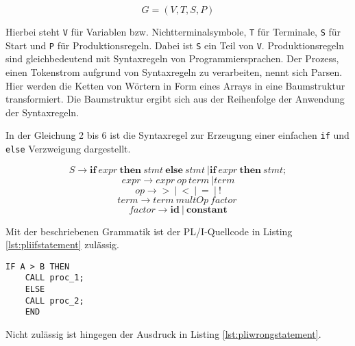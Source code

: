 \begin{center}
	\begin{equation}\label{eqn:grammar}
		G=(V,T,S,P)
	\end{equation}
\end{center}


Hierbei steht \verb+V+ für Variablen bzw. Nichtterminalsymbole, \verb+T+ für Terminale, \verb+S+ für Start und \verb+P+ für Produktionsregeln. Dabei ist \verb+S+ ein Teil von \verb+V+. Produktionsregeln sind gleichbedeutend mit Syntaxregeln von Programmiersprachen. 
Der Prozess, einen Tokenstrom aufgrund von Syntaxregeln zu verarbeiten, nennt sich Parsen.
Hier werden die Ketten von Wörtern in Form eines Arrays in eine Baumstruktur transformiert.
Die Baumstruktur ergibt sich aus der Reihenfolge der Anwendung der Syntaxregeln.


In der Gleichung 2 bis 6 ist die Syntaxregel zur Erzeugung einer einfachen \verb+if+ und \verb+else+ Verzweigung dargestellt.

\begin{center}
	\begin{equation}\label{eqn:start}
		S \to \mathbf{if}\: expr\: \mathbf{then}\: stmt\: \mathbf{else}\: stmt\: | \mathbf{if}\: expr\: \mathbf{then}\: stmt;
	\end{equation}
	\begin{equation}
		expr \to expr\: op\: term\: | term
	\end{equation}
	\begin{equation}
		op \to \mathbf{>}\: |\: \mathbf{<}\: |\: \mathbf{=}\: |\: \mathbf{!}
	\end{equation}
	\begin{equation}
		term \to term\: multOp\: factor\:
	\end{equation}
	\begin{equation}
		factor \to \mathbf{id}\: |\: \mathbf{constant}
	\end{equation}
\end{center}

\pagebreak
Mit der beschriebenen Grammatik ist der PL/I-Quellcode in Listing \ref{lst:pliifstatement} zulässig.

\begin{lstlisting}[language=PL/I, caption=PL/I-Verzweigung, label={lst:pliifstatement}]
	IF A > B THEN
	CALL proc_1;
	ELSE
	CALL proc_2;
	END
\end{lstlisting}

Nicht zulässig ist hingegen der Ausdruck in Listing \ref{lst:pliwrongstatement}.

